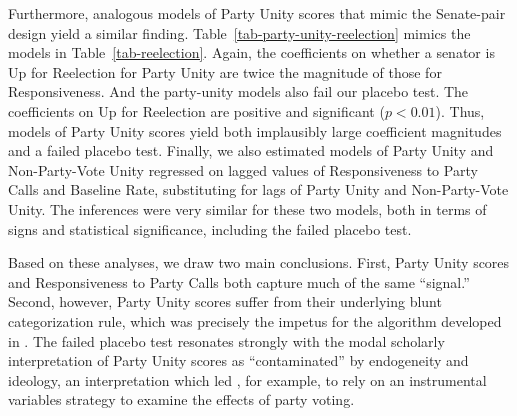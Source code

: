 \documentclass[12pt]{article}
\begin{document}
Furthermore, analogous models of Party Unity scores that mimic the Senate-pair
design yield a similar finding.
Table~\ref{tab-party-unity-reelection} mimics the models in
Table~\ref{tab-reelection}.
Again, the coefficients on whether a senator is Up for Reelection for
Party Unity are twice the
magnitude of those for Responsiveness.
And the party-unity models also fail our placebo test.
The coefficients on Up for Reelection are positive and significant
($p < 0.01$).
Thus, models of Party Unity scores yield both implausibly large coefficient
magnitudes and a failed placebo test.
Finally, we also estimated models of Party Unity and Non-Party-Vote Unity
regressed on lagged values of Responsiveness to Party Calls and Baseline Rate,
substituting for lags of Party Unity and Non-Party-Vote Unity.
The inferences were very similar for these two models, both in terms of
signs and statistical significance, including the failed placebo test.

Based on these analyses, we draw two main conclusions.
First, Party Unity scores and Responsiveness to Party Calls both capture much of
the same ``signal.''
Second, however, Party Unity scores suffer from their underlying blunt
categorization rule, which was precisely the impetus for the algorithm
developed in \cite{Minozzi:2013}. The failed placebo test resonates strongly
with the modal scholarly interpretation of
Party Unity scores as ``contaminated'' by endogeneity and ideology,
an interpretation which led \cite{Carson:2010}, for example, to rely on an
instrumental variables strategy to examine the effects of party voting.

\clearpage


\singlespacing


\end{document}
